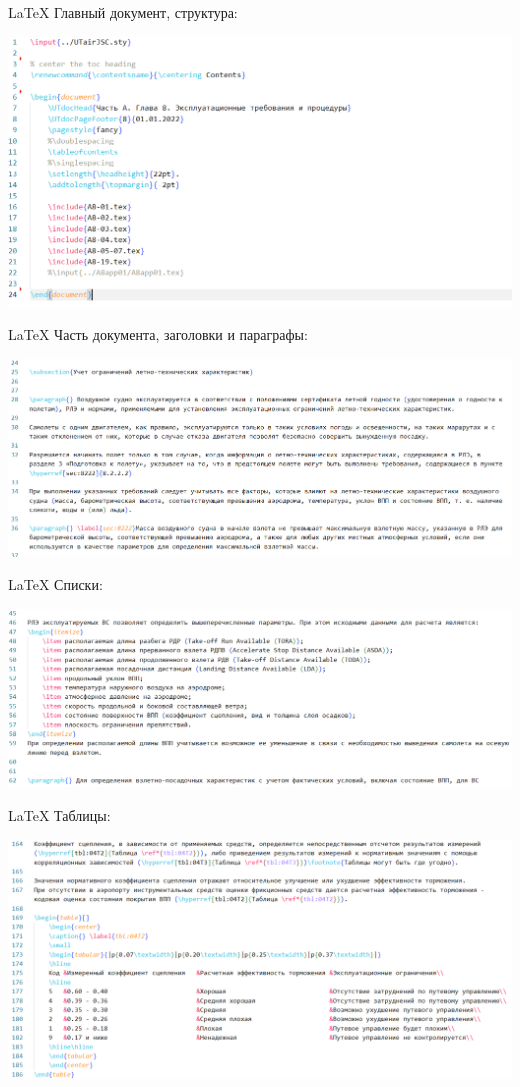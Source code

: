 \documentclass[utf8]{beamer}
\begin{document}
\begin{frame}{LaTeX}  
    Главный документ, структура:

    \includegraphics[width=\textwidth]{lt08-a8-1.png}           
\end{frame}
\begin{frame}{LaTeX}  
    Часть документа, заголовки и параграфы:

    \includegraphics[width=\textwidth]{lt09-a8-2.png}           
\end{frame}
\begin{frame}{LaTeX}  
    Списки:
 
    \includegraphics[width=\textwidth]{lt10-a8-3.png}           
\end{frame}
\begin{frame}{LaTeX}  
    Таблицы:

    \includegraphics[width=\textwidth]{lt11-a8-4.png}           
\end{frame}
\end{document}
